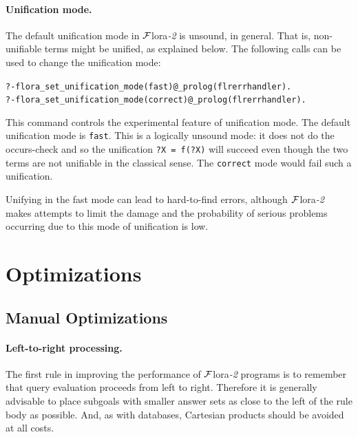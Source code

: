 \documentclass[11pt]{article}
\newcommand{\FLORA}{{\mbox{\sc ${\cal F}${lora}\rm\emph{-2}}}\xspace}
\begin{document}
\paragraph{Unification mode.} The default unification mode in \FLORA is
unsound, in general. That is, non-unifiable terms might be unified, as
explained below. The following calls can be used to change the unification
mode:
\begin{alltt}
    ?- flora_set_unification_mode(fast)@_prolog(flrerrhandler).
    ?- flora_set_unification_mode(correct)@_prolog(flrerrhandler).
\end{alltt}
This command controls the experimental feature of unification mode.
The default unification mode is \texttt{fast}. This is a logically unsound
mode: it does not do the occurs-check and so the unification
\texttt{?X = f(?X)} will succeed even though the two terms are not
unifiable in the classical sense. The \texttt{correct} mode would fail such a
unification.

Unifying in the fast mode can lead to hard-to-find errors, although \FLORA
makes attempts to limit the damage and the probability of serious problems
occurring due to this mode of unification is low.


\section{Optimizations}

\subsection{Manual Optimizations}

\paragraph{Left-to-right processing.}
The first rule in improving the performance of \FLORA programs is to
remember that query evaluation proceeds from left to right. Therefore it is
generally advisable to place subgoals with smaller answer sets as close to
the left of the rule body as possible. And, as with databases, Cartesian
products should be avoided at all costs.
\end{document}

